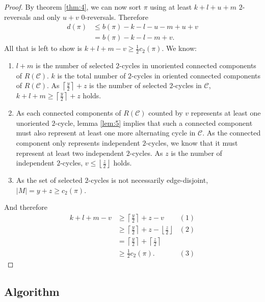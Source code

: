 \documentclass[11pt,DIV=11]{scrartcl}
\theoremstyle{definition}
\theoremstyle{remark}
\begin{document}
\begin{proof}
By theorem \ref{thm:4}, we can now sort $\pi$ using at least $k+l+u+m$ $2$-reversals and only $u+v$ $0$-reversals. Therefore
\begin{align*}
    d(\pi) &\leq b(\pi) - k - l - u - m + u + v \\
           &= b(\pi) - k - l - m + v.
\end{align*}
All that is left to show is $k+l+m-v \geq \frac{1}{2} c_2(\pi)$. We know:
\begin{enumerate}
    \item $l+m$ is the number of selected $2$-cycles in unoriented connected components of $R(\mathcal{C})$. $k$ is the total number of $2$-cycles in oriented connected components of $R(\mathcal{C})$. As $\left\lceil \frac{y}{2} \right\rceil + z$ is the number of selected $2$-cycles in $\mathcal{C}$, $k+l+m \geq \left\lceil \frac{y}{2} \right\rceil + z$ holds.
    \item As each connected components of $R(\mathcal{C})$ counted by $v$ represents at least one unoriented $2$-cycle, lemma \ref{lem:5} implies that such a connected component must also represent at least one more alternating cycle in $\mathcal{C}$. As the connected component only represents independent $2$-cycles, we know that it must represent at least two independent $2$-cycles. As $z$ is the number of independent $2$-cycles, $v \leq \left\lfloor \frac{z}{2} \right\rfloor$ holds.
    \item As the set of selected $2$-cycles is not necessarily edge-disjoint, $|M| = y+z \geq c_2(\pi)$.
\end{enumerate}
And therefore
\begin{align*}
    k+l+m-v &\geq \left\lceil \frac{y}{2} \right\rceil + z - v                                          & (1) \\
            &\geq \left\lceil \frac{y}{2} \right\rceil + z - \left\lfloor \frac{z}{2} \right\rfloor     & (2) \\
            &= \left\lceil \frac{y}{2} \right\rceil + \left\lceil \frac{z}{2} \right\rceil \\
            &\geq \frac{1}{2} c_2(\pi).                                                                 & (3)
\end{align*}
\end{proof}

\subsection{Algorithm}
\label{sec:algorithm}
\end{document}
